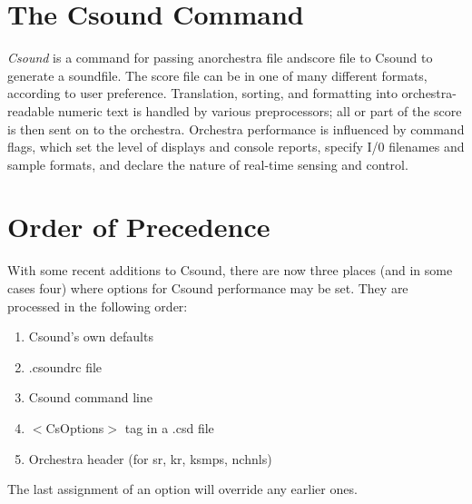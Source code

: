 \begin{comment}
\documentclass[10pt]{article}
\usepackage{fullpage, graphicx, url}
\setlength{\parskip}{1ex}
\setlength{\parindent}{0ex}
\title{The Csound Command}



\begin{tabular}{ccc}
The Alternative Csound Reference Manual & & \\
Previous & &Next

\end{tabular}

\end{comment}
\section{The Csound Command}


 \emph{Csound}
 is a command for passing anorchestra file andscore file to Csound to generate a soundfile. The score file can be in one of many different formats, according to user preference. Translation, sorting, and formatting into orchestra-readable numeric text is handled by various preprocessors; all or part of the score is then sent on to the orchestra. Orchestra performance is influenced by command flags, which set the level of displays and console reports, specify I/0 filenames and sample formats, and declare the nature of real-time sensing and control. 
\section{Order of Precedence}


  With some recent additions to Csound, there are now three places (and in some cases four) where options for Csound performance may be set. They are processed in the following order: 


 
\begin{enumerate}
\item 

 Csound's own defaults

\item 

 .csoundrc file

\item 

 Csound command line

\item 

 $<$CsOptions$>$ tag in a .csd file

\item 

 Orchestra header (for sr, kr, ksmps, nchnls)


\end{enumerate}


  The last assignment of an option will override any earlier ones. 


\begin{comment}
\begin{tabular}{lcr}
Previous &Home &Next \\
The Csound Mailing List &Up &Description

\end{tabular}



\end{comment}
